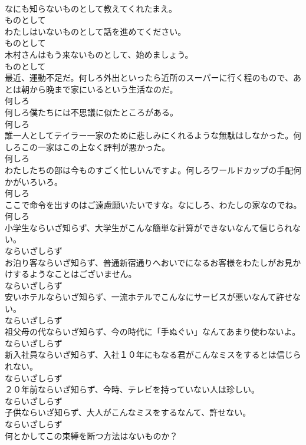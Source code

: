 \documentclass[8pt]{extreport}
\begin{document}
\begin{CJK}{UTF8}{min}
\\	なにも知らないものとして教えてくれたまえ。	
\\	ものとして
\\	わたしはいないものとして話を進めてください。	
\\	ものとして
\\	木村さんはもう来ないものとして、始めましょう。	
\\	ものとして
\\	最近、運動不足だ。何しろ外出といったら近所のスーパーに行く程のもので、あとは朝から晩まで家にいるという生活なのだ。	
\\	何しろ
\\	何しろ僕たちには不思議に似たところがある。	
\\	何しろ
\\	誰一人としてテイラー一家のために悲しみにくれるような無駄はしなかった。何しろこの一家はこの上なく評判が悪かった。	
\\	何しろ
\\	わたしたちの部は今ものすごく忙しいんですよ。何しろワールドカップの手配何かがいろいろ。	
\\	何しろ
\\	ここで命令を出すのはご遠慮願いたいですな。なにしろ、わたしの家なのでね。	
\\	何しろ
\\	小学生ならいざ知らず、大学生がこんな簡単な計算ができないなんて信じられない。	
\\	ならいざしらず
\\	お泊り客ならいざ知らず、普通新宿通りへおいでになるお客様をわたしがお見かけするようなことはございません。	
\\	ならいざしらず
\\	安いホテルならいざ知らず、一流ホテルでこんなにサービスが悪いなんて許せない。	
\\	ならいざしらず
\\	祖父母の代ならいざ知らず、今の時代に「手ぬぐい」なんてあまり使わないよ。	
\\	ならいざしらず
\\	新入社員ならいざ知らず、入社１０年にもなる君がこんなミスをするとは信じられない。	
\\	ならいざしらず
\\	２０年前ならいざ知らず、今時、テレビを持っていない人は珍しい。	
\\	ならいざしらず
\\	子供ならいざ知らず、大人がこんなミスをするなんて、許せない。	
\\	ならいざしらず
\\	何とかしてこの束縛を断つ方法はないものか？	

\end{CJK}
\end{document}
